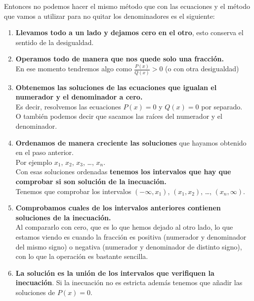 \documentclass[a4paper,11pt,answers]{exam}
\begin{document}
Entonces no podemos hacer el mismo método que con las ecuaciones y el método que vamos a utilizar para no quitar los denominadores es el siguiente:
\begin{enumerate}
\item \textbf{Llevamos todo a un lado y dejamos cero en el otro}, esto conserva el sentido de la desigualdad.
\item \textbf{Operamos todo de manera que nos quede solo una fracción.}\\
  En ese momento tendremos algo como $\frac{P(x)}{Q(x)} > 0$ (o con otra desigualdad)
\item \textbf{Obtenemos las soluciones de las ecuaciones que igualan el numerador y el denominador a cero.}\\
  Es decir, resolvemos las ecuaciones $P(x) = 0$ y $Q(x) = 0$ por separado.\\
  O también podemos decir que sacamos las raíces del numerador y el denominador.
\item \textbf{Ordenamos de manera creciente las soluciones} que hayamos obtenido en el paso anterior.\\
  Por ejemplo {$x_1$, $x_2$, $x_3$, \dots, $x_n$}.\\
  Con esas soluciones ordenadas \textbf{tenemos los intervalos que hay que comprobar si son solución de la
  inecuación.}\\
  Tenemos que comprobar los intervalos $(-\infty, x_1)$, $(x_1, x_2)$, \dots, $(x_n, \infty)$.
\item \textbf{Comprobamos cuales de los intervalos anteriores contienen soluciones de la inecuación.}\\
  Al compararlo con cero, que es lo que hemos dejado al otro lado, lo que estamos viendo es cuando la
  fracción es positiva (numerador y denominador del mismo signo) o negativa (numerador y denominador de
  distinto signo), con lo que la operación es bastante sencilla.
\item \textbf{La solución es la unión de los intervalos que verifiquen la inecuación}. Si la inecuación no es
  estricta además tenemos que añadir las soluciones de $P(x) = 0$.
\end{enumerate}
\end{document}
